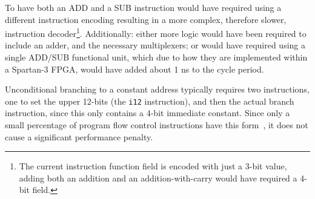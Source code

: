\begin{table}[h!]
\begin{center}
\end{center}
\caption[RISC16 addition operation]{RISC16 does not have an addition
instruction, but the same operation can be completed with two subtract
instructions.}
\label{RISC16_Addition}
\end{table}

To have both an ADD and a SUB instruction would have required using a different
instruction encoding resulting in a more complex, therefore slower, instruction
decoder\footnote{The current instruction function field is encoded with just a
3-bit value, adding both an addition and an addition-with-carry would have
required a 4-bit field.}. Additionally: either more logic would have been
required to include an adder, and the necessary multiplexers; or would have
required using a single ADD/SUB functional unit, which due to how they are
implemented within a Spartan-3 FPGA, would have added about 1 ns to the cycle
period.

Unconditional branching to a constant address typically requires two
instructions, one to set the upper 12-bits (the \texttt{i12} instruction), and
then the actual branch instruction, since this only contains a 4-bit immediate
constant. Since only a small percentage of program flow control instructions have
this form~\cite{mcfarland2003md}, it does not cause a significant performance
penalty.


